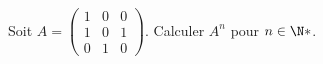 \begin{enonce}
\begin{exercise}[ID={RMS123 E959, CCP PSI},subtitle={},tags={}, difficulty={0}]
Soit
\begin{math}
  A=
  \begin{pmatrix}
  1&0&0\\
  1&0&1\\
  0&1&0
  \end{pmatrix}
\end{math}.
Calculer $A^n$ pour $n\in\N*$.
\end{exercise}
\begin{solution}
\end{solution}
\end{enonce}
